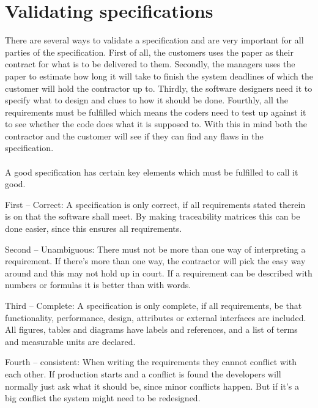 \documentclass[Main]{subfiles}
\begin{document}
\section{Validating specifications}


There are several ways to validate a specification and are very important for all parties of the specification.
First of all, the customers uses the paper as their contract for what is to be delivered to them.
Secondly, the managers uses the paper to estimate how long it will take to finish the system deadlines of which the customer will hold the contractor up to.
Thirdly, the software designers need it to specify what to design and clues to how it should be done.
Fourthly, all the requirements must be fulfilled which means the coders need to test up against it to see whether the code does what it is supposed to.
With this in mind both the contractor and the customer will see if they can find any flaws in the specification.
\\
\\
A good specification has certain key elements which must be fulfilled to call it good.


First -- Correct:
A specification is only correct, if all requirements stated therein is on that the software shall meet.
By making traceability matrices this can be done easier, since this ensures all requirements.

Second -- Unambiguous:
There must not be more than one way of interpreting a requirement. 
If there's more than one way, the contractor will pick the easy way around and this may not hold up in court.
If a requirement can be described with numbers or formulas it is better than with words.

Third -- Complete:
A specification is only complete, if all requirements, be that functionality, performance, design, attributes or external interfaces are included.
All figures, tables and diagrams have labels and references, and a list of terms and measurable units are declared.

Fourth -- consistent:
When writing the requirements they cannot conflict with each other.
If production starts and a conflict is found the developers will normally just ask what it should be, since minor conflicts happen.
But if it's a big conflict the system might need to be redesigned. 
\end{document}

